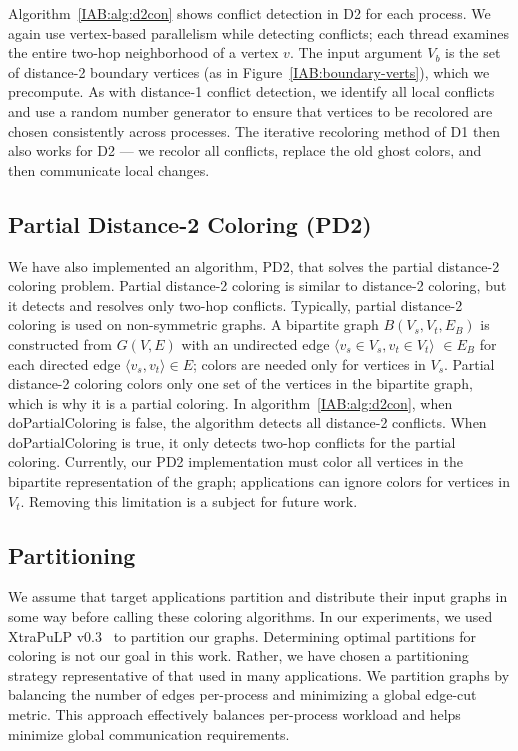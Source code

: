 Algorithm~\ref{IAB:alg:d2con} shows conflict detection in D2 for each process.
We again use vertex-based parallelism while detecting conflicts; each thread examines the entire two-hop neighborhood of a vertex $v$.
The input argument $V_b$ is the set of distance-2 boundary vertices (as in Figure~\ref{IAB:boundary-verts}), which we precompute.
As with distance-1 conflict detection, we identify all local conflicts and use a random number generator to ensure that vertices to be recolored are chosen consistently across processes.
The iterative recoloring method of D1 then also works for D2 --- we recolor all conflicts, replace the old ghost colors, and then communicate local changes.

\subsection{Partial Distance-2 Coloring (PD2)}\label{IAB:method:PD2}

We have also implemented an algorithm, PD2, that solves the partial distance-2 coloring problem.
Partial distance-2 coloring is similar to distance-2 coloring, but it detects and resolves only two-hop conflicts.
Typically, partial distance-2 coloring is used on non-symmetric graphs.  A bipartite graph 
$B(V_s, V_t, E_B)$ is constructed from $G(V,E)$ with an undirected edge 
$\langle v_s \in V_s, v_t \in V_t \rangle$ $\in E_B$ 
for each directed edge $\langle v_s, v_t \rangle \in E$; colors are needed only for vertices in $V_s$.
Partial distance-2 coloring colors only one set of the vertices in the bipartite graph, 
which is why it is a partial coloring.
In algorithm~\ref{IAB:alg:d2con}, when doPartialColoring is false, the algorithm detects all distance-2 conflicts. 
When doPartialColoring is true, it only detects two-hop conflicts for the partial coloring.
Currently, our PD2 implementation must color all vertices in the bipartite representation of the graph;
applications can ignore colors for vertices in $V_t$.
Removing this limitation is a subject for future work.


\subsection{Partitioning}

We assume that target applications partition and distribute their input graphs in some way before calling these coloring algorithms. In our experiments, we used XtraPuLP v0.3~\cite{slota2017partitioning} to partition our graphs. 
Determining optimal partitions for coloring is not our goal in this work.
Rather, we have chosen a partitioning strategy representative of that used in many
applications.  We partition graphs by balancing the number of edges per-process and minimizing a global edge-cut metric. 
This approach effectively balances per-process workload and helps minimize global communication requirements.
